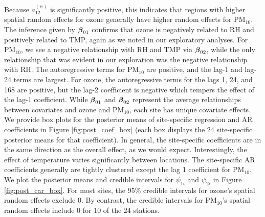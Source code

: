 \documentclass[alpha-refs]{wiley-article}
\newcommand{\bbeta}{ \mbox{\boldmath $ \beta $} }
\begin{document}
 Because $a_{12}^{(\psi)}$ is significantly positive, this indicates that regions with higher spatial random effects for ozone generally have higher random effects for $\text{PM}_{10}$. The inference given by $\bbeta_{01}$ confirms that ozone is negatively related to RH and positively related to TMP, again as we noted in our exploratory analyses. For $\text{PM}_{10}$, we see a negative relationship with RH and TMP via $\bbeta_{02}$, while the only relationship that was evident in our exploration was the negative relationship with RH. The autoregressive terms for $\text{PM}_{10}$ are positive, and the lag-1 and lag-24 terms are largest. For ozone, the autoregressive terms for the lags 1, 24, and 168 are positive, but the lag-2 coefficient is negative which tempers the effect of the lag-1 coefficient. While $\bbeta_{01}$ and $\bbeta_{02}$ represent the average relationships between covariates and ozone and $\text{PM}_{10}$, each site has unique covariate effects. We provide box plots for the posterior means of site-specific regression and AR coefficients in Figure \ref{fig:post_coef_box} (each box displays the 24 site-specific posterior means for that coefficient). In general, the site-specific coefficients are in the same direction as the overall effect, as we would expect. Interestingly, the effect of temperature varies significantly between locations. The site-specific AR coefficients generally are tightly clustered except the lag 1 coefficient for $\text{PM}_{10}$. We plot the posterior means and credible intervals for $\psi_{1i}$ and $\psi_{2i}$ in Figure \ref{fig:post_car_box}. For most sites, the 95\% credible intervals for ozone's spatial random effects exclude 0. By contrast, the credible intervals for $\text{PM}_{10}$'s spatial random effects include 0 for 10 of the 24 stations.

\vspace{-2mm}
\end{document}
